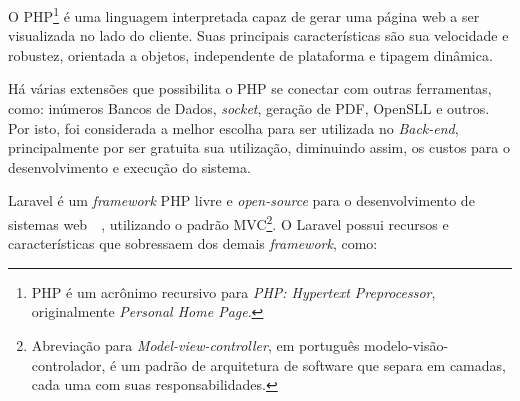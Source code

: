 \documentclass[
  12pt,				%
  openany,
  oneside,
  a4paper,			%
  english,			%
  brazil
]{article}
\numberwithin{figure}{section}
\numberwithin{table}{section}
\newcounter{subsubsubsection}[subsubsection]
\begin{document}
O PHP\footnote{PHP é um acrônimo recursivo para \textit{PHP: Hypertext Preprocessor}, originalmente \textit{Personal Home Page}.} é uma linguagem interpretada capaz de gerar uma página web a ser visualizada no lado do cliente. Suas principais características são sua velocidade e robustez, orientada a objetos, independente de plataforma e tipagem dinâmica. 

Há várias extensões que possibilita o PHP se conectar com outras ferramentas, como: inúmeros Bancos de Dados, \textit{socket}, geração de PDF, OpenSLL e outros. Por isto, foi considerada a melhor escolha para ser utilizada no \textit{Back-end}, principalmente por ser gratuita sua utilização, diminuindo assim, os custos para o desenvolvimento e execução do sistema.



Laravel é um \textit{framework} PHP livre e \textit{open-source} para o desenvolvimento de sistemas web~\cite{laravel5}~\cite{laravel_kiliccdaugi}, utilizando o padrão MVC\footnote{Abreviação para \textit{Model-view-controller}, em português modelo-visão-controlador, é um padrão de arquitetura de software que separa em camadas, cada uma com suas responsabilidades.}. O Laravel possui recursos e características que sobressaem dos demais \textit{framework}, como: 
\end{document}
